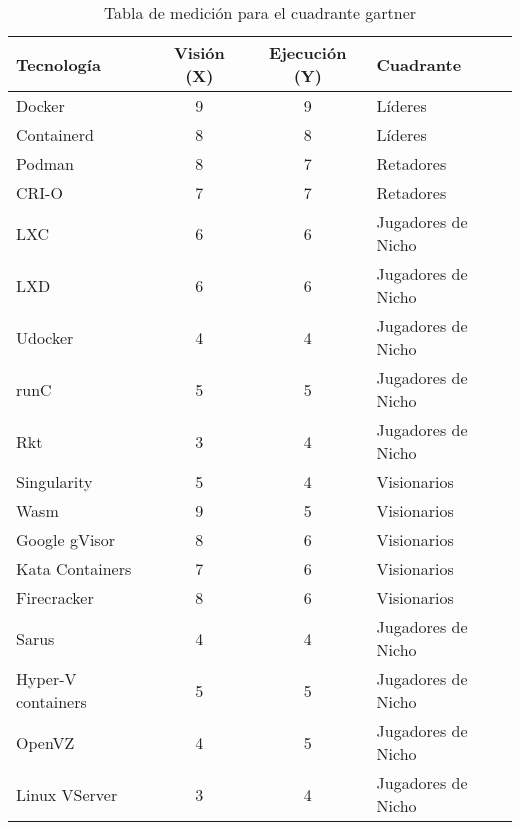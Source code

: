 \begin{table}[H]
\centering
\scriptsize
\setlength{\tabcolsep}{4pt}
\renewcommand{\arraystretch}{1.0}
\begin{tabular}{|p{}|c|c|p{}|}
\hline
\textbf{Tecnología} & \textbf{Visión (X)} & \textbf{Ejecución (Y)} & \textbf{Cuadrante} \\
\hline
Docker & 9 & 9 & Líderes \\
\hline
Containerd & 8 & 8 & Líderes \\
\hline
Podman & 8 & 7 & Retadores \\
\hline
CRI-O & 7 & 7 & Retadores \\
\hline
LXC & 6 & 6 & Jugadores de Nicho \\
\hline
LXD & 6 & 6 & Jugadores de Nicho \\
\hline
Udocker & 4 & 4 & Jugadores de Nicho \\
\hline
runC & 5 & 5 & Jugadores de Nicho \\
\hline
Rkt & 3 & 4 & Jugadores de Nicho \\
\hline
Singularity & 5 & 4 & Visionarios \\
\hline
Wasm & 9 & 5 & Visionarios \\
\hline
Google gVisor & 8 & 6 & Visionarios \\
\hline
Kata Containers & 7 & 6 & Visionarios \\
\hline
Firecracker & 8 & 6 & Visionarios \\
\hline
Sarus & 4 & 4 & Jugadores de Nicho \\
\hline
Hyper-V containers & 5 & 5 & Jugadores de Nicho \\
\hline
OpenVZ & 4 & 5 & Jugadores de Nicho \\
\hline
Linux VServer & 3 & 4 & Jugadores de Nicho \\
\hline
\end{tabular}
\caption{Tabla de medición para el cuadrante gartner}\label{tab:cuadrante-gartner}
\end{table}